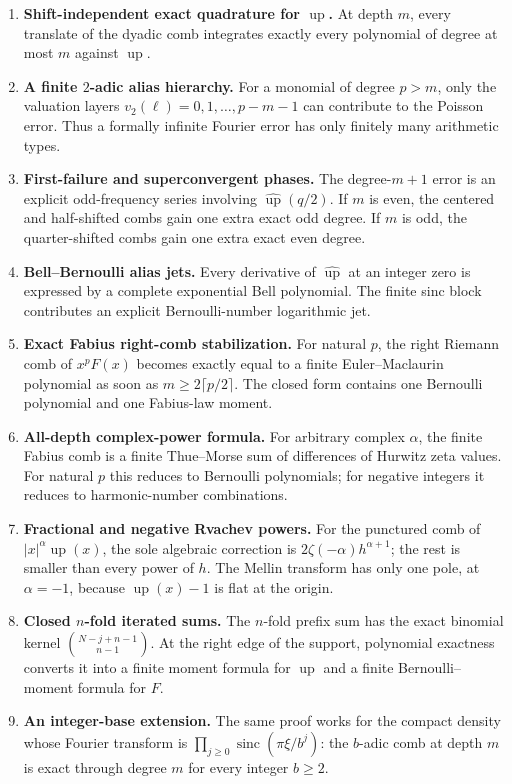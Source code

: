 \documentclass[11pt]{article}
\theoremstyle{definition}
\DeclareMathOperator{\sinc}{sinc}
\newcommand{\Up}{\operatorname{up}}
\begin{document}
\begin{enumerate}[leftmargin=2.2em]
\item \textbf{Shift-independent exact quadrature for $\Up$.}
At depth $m$, every translate of the dyadic comb integrates exactly every
polynomial of degree at most $m$ against $\Up$.

\item \textbf{A finite $2$-adic alias hierarchy.}
For a monomial of degree $p>m$, only the valuation layers
$v_2(\ell)=0,1,\dots,p-m-1$ can contribute to the Poisson error.  Thus a
formally infinite Fourier error has only finitely many arithmetic types.

\item \textbf{First-failure and superconvergent phases.}
The degree-$m+1$ error is an explicit odd-frequency series involving
$\widehat{\Up}(q/2)$.  If $m$ is even, the centered and half-shifted combs gain
one extra exact odd degree.  If $m$ is odd, the quarter-shifted combs gain one
extra exact even degree.

\item \textbf{Bell--Bernoulli alias jets.}
Every derivative of $\widehat{\Up}$ at an integer zero is expressed by a
complete exponential Bell polynomial.  The finite sinc block contributes an
explicit Bernoulli-number logarithmic jet.

\item \textbf{Exact Fabius right-comb stabilization.}
For natural $p$, the right Riemann comb of $x^pF(x)$ becomes exactly equal to a
finite Euler--Maclaurin polynomial as soon as $m\ge2\lceil p/2\rceil$.  The
closed form contains one Bernoulli polynomial and one Fabius-law moment.

\item \textbf{All-depth complex-power formula.}
For arbitrary complex $\alpha$, the finite Fabius comb is a finite
Thue--Morse sum of differences of Hurwitz zeta values.  For natural $p$ this
reduces to Bernoulli polynomials; for negative integers it reduces to
harmonic-number combinations.

\item \textbf{Fractional and negative Rvachev powers.}
For the punctured comb of $|x|^\alpha\Up(x)$, the sole algebraic correction is
$2\zeta(-\alpha)h^{\alpha+1}$; the rest is smaller than every power of $h$.
The Mellin transform has only one pole, at $\alpha=-1$, because
$\Up(x)-1$ is flat at the origin.

\item \textbf{Closed $n$-fold iterated sums.}
The $n$-fold prefix sum has the exact binomial kernel
$\binom{N-j+n-1}{n-1}$.  At the right edge of the support, polynomial
exactness converts it into a finite moment formula for $\Up$ and a finite
Bernoulli--moment formula for $F$.

\item \textbf{An integer-base extension.}
The same proof works for the compact density whose Fourier transform is
$\prod_{j\ge0}\sinc(\pi\xi/b^j)$: the $b$-adic comb at depth $m$ is exact
through degree $m$ for every integer $b\ge2$.
\end{enumerate}
\end{document}
